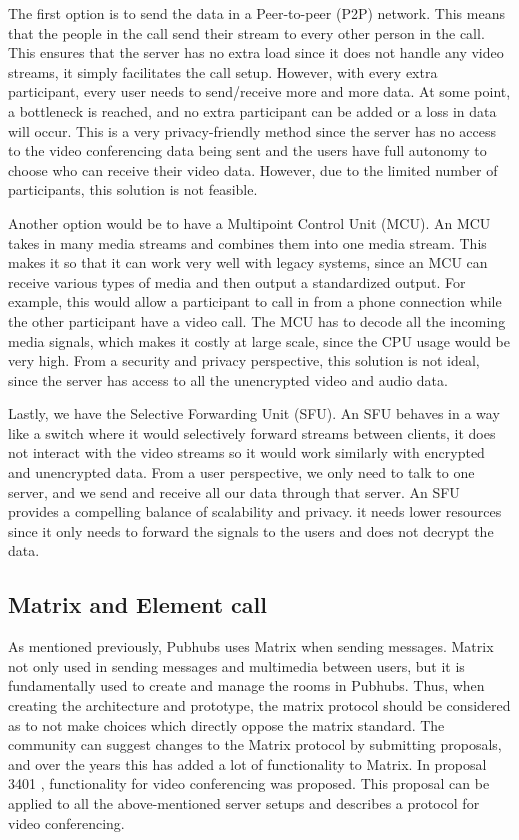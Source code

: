 \documentclass{report}
\theoremstyle{definition}
\theoremstyle{remark}
\begin{document}
The first option is to send the data in a Peer-to-peer (P2P) network. This means that the people in the call send their stream to every other person in the call. This ensures that the server has no extra load since it does not handle any video streams, it simply facilitates the call setup. However, with every extra participant, every user needs to send/receive more and more data. At some point, a bottleneck is reached, and no extra participant can be added or a loss in data will occur. This is a very privacy-friendly method since the server has no access to the video conferencing data being sent and the users have full autonomy to choose who can receive their video data. However, due to the limited number of participants, this solution is not feasible.

Another option would be to have a Multipoint Control Unit (MCU). An MCU takes in many media streams and combines them into one media stream. This makes it so that it can work very well with legacy systems, since an MCU can receive various types of media and then output a standardized output. For example, this would allow a participant to call in from a phone connection while the other participant have a video call. The MCU has to decode all the incoming media signals, which makes it costly at large scale, since the CPU usage would be very high. From a security and privacy perspective, this solution is not ideal, since the server has access to all the unencrypted video and audio data. 

Lastly, we have the Selective Forwarding Unit (SFU). An SFU behaves in a way like a switch where it would selectively forward streams between clients, it does not interact with the video streams so it would work similarly with encrypted and unencrypted data. From a user perspective, we only need to talk to one server, and we send and receive all our data through that server. An SFU provides a compelling balance of scalability and privacy. it needs lower resources since it only needs to forward the signals to the users and does not decrypt the data. 

\subsection{Matrix and Element call}
As mentioned previously, Pubhubs uses Matrix when sending messages. Matrix not only used in sending messages and multimedia between users, but it is fundamentally used to create and manage the rooms in Pubhubs. Thus, when creating the architecture and prototype, the matrix protocol should be considered as to not make choices which directly oppose the matrix standard. The community can suggest changes to the Matrix protocol by submitting proposals, and over the years this has added a lot of functionality to Matrix. In proposal 3401 \cite{MATRIX_VIDEO_CALL_PROP}, functionality for video conferencing was proposed. This proposal can be applied to all the above-mentioned server setups and describes a protocol for video conferencing. 
\end{document}
